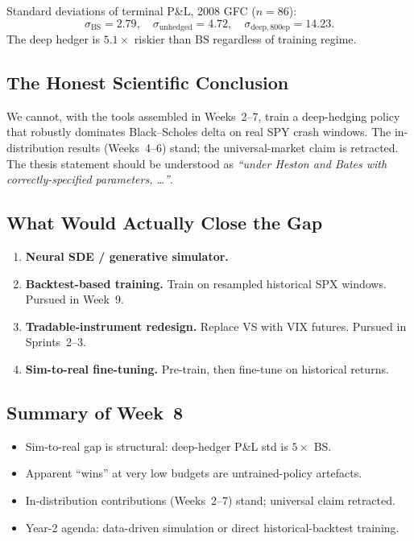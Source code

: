 \documentclass[11pt, a4paper]{article}
\begin{document}
Standard deviations of terminal P\&L, 2008 GFC ($n=86$):
\[
\sigma_{\mathrm{BS}} = 2.79,\quad
\sigma_{\mathrm{unhedged}} = 4.72,\quad
\sigma_{\mathrm{deep,800ep}} = 14.23.
\]
The deep hedger is $5.1\times$ riskier than BS regardless of training regime.

\subsection{The Honest Scientific Conclusion}

We cannot, with the tools assembled in Weeks~2--7, train a deep-hedging
policy that robustly dominates Black--Scholes delta on real SPY crash
windows. The in-distribution results (Weeks~4--6) stand; the
universal-market claim is retracted. The thesis statement should be
understood as \emph{``under Heston and Bates with correctly-specified
parameters, \ldots''}.

\subsection{What Would Actually Close the Gap}
\label{sec:year2-plan}

\begin{enumerate}[label=\textbf{\alph*.}]
\item \textbf{Neural SDE / generative simulator.}
\item \textbf{Backtest-based training.} Train on resampled historical SPX
      windows. Pursued in Week~9.
\item \textbf{Tradable-instrument redesign.} Replace VS with VIX futures.
      Pursued in Sprints~2--3.
\item \textbf{Sim-to-real fine-tuning.} Pre-train, then fine-tune on
      historical returns.
\end{enumerate}

\subsection{Summary of Week~8}
\begin{itemize}
\item Sim-to-real gap is structural: deep-hedger P\&L std is $5\times$ BS.
\item Apparent ``wins'' at very low budgets are untrained-policy artefacts.
\item In-distribution contributions (Weeks~2--7) stand; universal claim retracted.
\item Year-2 agenda: data-driven simulation or direct historical-backtest training.
\end{itemize}
\end{document}
